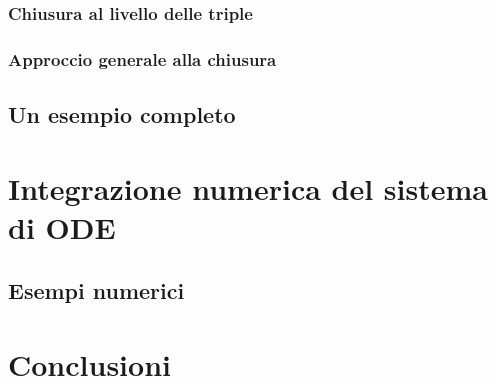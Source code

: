 \documentclass[12pt,a4paper,twoside]{report}
\begin{document}









\subsection{Chiusura al livello delle triple}

\lipsum[6-10]

\subsection{Approccio generale alla chiusura}

\lipsum[6-10]

\section{Un esempio completo}

\lipsum[6-10]

\chapter{Integrazione numerica del sistema di ODE}\label{ode}

\lipsum[6-7]

\section{Esempi numerici}

\lipsum[8-10]

\chapter*{Conclusioni}

\lipsum[11-14]




\cleardoublepage
\listoffigures
{}
\listoftables
{}
\tableofcontents
\end{document}
